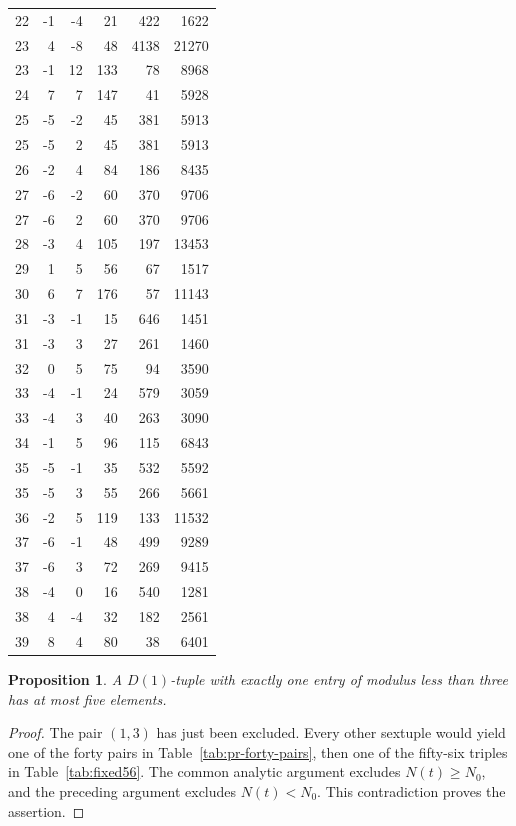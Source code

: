 \documentclass[12pt]{article}
\newtheorem{proposition}[theorem]{Proposition}
\numberwithin{equation}{section}
\begin{document}
\begin{longtable}{r|r r|r|r|r}
22 & -1 & -4 & 21 & 422 & 1622 \\
23 & 4 & -8 & 48 & 4138 & 21270 \\
23 & -1 & 12 & 133 & 78 & 8968 \\
24 & 7 & 7 & 147 & 41 & 5928 \\
25 & -5 & -2 & 45 & 381 & 5913 \\
25 & -5 & 2 & 45 & 381 & 5913 \\
26 & -2 & 4 & 84 & 186 & 8435 \\
27 & -6 & -2 & 60 & 370 & 9706 \\
27 & -6 & 2 & 60 & 370 & 9706 \\
28 & -3 & 4 & 105 & 197 & 13453 \\
29 & 1 & 5 & 56 & 67 & 1517 \\
30 & 6 & 7 & 176 & 57 & 11143 \\
31 & -3 & -1 & 15 & 646 & 1451 \\
31 & -3 & 3 & 27 & 261 & 1460 \\
32 & 0 & 5 & 75 & 94 & 3590 \\
33 & -4 & -1 & 24 & 579 & 3059 \\
33 & -4 & 3 & 40 & 263 & 3090 \\
34 & -1 & 5 & 96 & 115 & 6843 \\
35 & -5 & -1 & 35 & 532 & 5592 \\
35 & -5 & 3 & 55 & 266 & 5661 \\
36 & -2 & 5 & 119 & 133 & 11532 \\
37 & -6 & -1 & 48 & 499 & 9289 \\
37 & -6 & 3 & 72 & 269 & 9415 \\
38 & -4 & 0 & 16 & 540 & 1281 \\
38 & 4 & -4 & 32 & 182 & 2561 \\
39 & 8 & 4 & 80 & 38 & 6401 \\
\end{longtable}
\begin{proposition}\label{prop:one-small}
A $D(1)$-tuple with exactly one entry of modulus less than three has
at most five elements.
\end{proposition}
\begin{proof}
The pair $(1,3)$ has just been excluded. Every other sextuple would
yield one of the forty pairs in Table~\ref{tab:pr-forty-pairs}, then
one of the fifty-six triples in Table~\ref{tab:fixed56}. The common
analytic argument excludes $N(t)\ge N_0$, and the preceding argument
excludes $N(t)<N_0$. This contradiction proves the assertion.
\end{proof}
\end{document}
